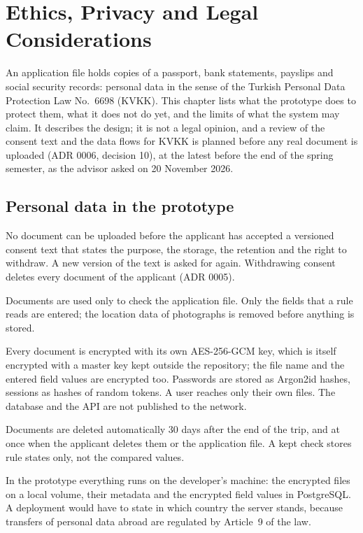 \chapter{Ethics, Privacy and Legal Considerations}\label{ch:ethics}
An application file holds copies of a passport, bank statements, payslips and social security
records: personal data in the sense of the Turkish Personal Data Protection Law No.~6698 (KVKK).
This chapter lists what the prototype does to protect them, what it does not do yet, and the
limits of what the system may claim. It describes the design; it is not a legal opinion, and a
review of the consent text and the data flows for KVKK is planned before any real document is
uploaded (ADR 0006, decision 10), at the latest before the end of the spring semester, as the
advisor asked on 20 November 2026.

\section{Personal data in the prototype}
\begin{description}[style=nextline,leftmargin=1.2cm]
  \item[Consent] No document can be uploaded before the applicant has accepted a versioned consent
    text that states the purpose, the storage, the retention and the right to withdraw. A new
    version of the text is asked for again. Withdrawing consent deletes every document of the
    applicant (ADR 0005).
  \item[Purpose and minimisation] Documents are used only to check the application file. Only the
    fields that a rule reads are entered; the location data of photographs is removed before
    anything is stored.
  \item[Security] Every document is encrypted with its own AES-256-GCM key, which is itself
    encrypted with a master key kept outside the repository; the file name and the entered field
    values are encrypted too. Passwords are stored as Argon2id hashes, sessions as hashes of
    random tokens. A user reaches only their own files. The database and the API are not
    published to the network.
  \item[Retention and deletion] Documents are deleted automatically 30 days after the end of the
    trip, and at once when the applicant deletes them or the application file. A kept check stores
    rule states only, not the compared values.
  \item[Where the data is] In the prototype everything runs on the developer's machine: the
    encrypted files on a local volume, their metadata and the encrypted field values in
    PostgreSQL. A deployment would have to state in which country the server stands, because
    transfers of personal data abroad are regulated by Article~9 of the law.
\end{description}

